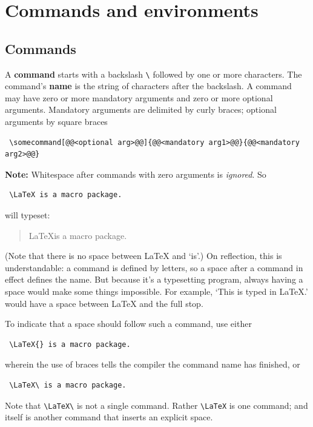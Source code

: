 \documentclass[a4paper,11pt]{scrreprt}\usepackage[]{graphicx}\usepackage[]{color}
\let\oldLaTeX\LaTeX
\renewcommand{\LaTeX}{\textrm{\oldLaTeX}}
\newcommand{\defi}[1]{\textbf{\textsf{#1}}}
\newcommand{\Code}[1]{\Colorbox{gray!10}{\lstinline!#1!}}
\begin{document}
 
 \section{Commands and environments}
 \subsection{Commands}
 A \defi{command} starts with a backslash \verb=\= followed by one or more characters.
 The command's \defi{name} is the string of characters after the backslash. 
 A {command} may have zero or more mandatory arguments and zero or more optional arguments. 
 Mandatory arguments are delimited by curly braces; optional arguments by square braces

 \begin{lstlisting}
 \somecommand[@@<optional arg>@@]{@@<mandatory arg1>@@}{@@<mandatory arg2>@@}
 \end{lstlisting} 

 \textbf{\textsf{Note:}} Whitespace after commands with zero arguments is \emph{ignored}. So 

 \begin{lstlisting}
 \LaTeX is a macro package.
 \end{lstlisting}
 
 will typeset: 
\begin{quote}
 \LaTeX is a macro package.
 \end{quote} 
 (Note that there is no space between \LaTeX{} and `is'.)
 On reflection, this is understandable: a command is defined by letters, so a space after a command in effect defines the name.
 But because it's a typesetting program, always having a space would make some things impossible. 
 For example, `This is typed in \LaTeX.' would have a space between \LaTeX{} and the full stop.

 To indicate that a space should follow such a command, use either 

 \begin{lstlisting}
 \LaTeX{} is a macro package.
 \end{lstlisting}
 wherein the use of braces tells the compiler the command name has finished, or 

 \begin{lstlisting}
 \LaTeX\ is a macro package.
 \end{lstlisting}
 Note that \lstinline!\LaTeX\! is not a single command. 
 Rather \lstinline!\LaTeX! is one command; and \Code{\\  } itself is another command that inserts an explicit space. 
\end{document}
